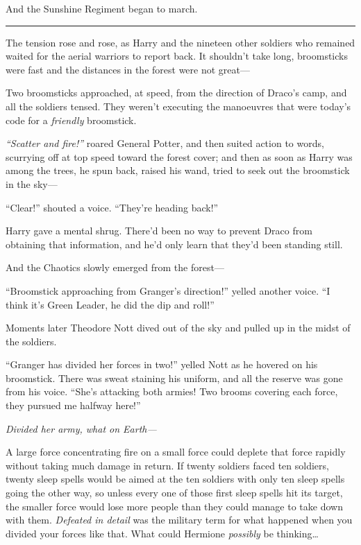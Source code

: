And the Sunshine Regiment began to march.

\begin{center}\rule{3in}{0.4pt}\end{center}

The tension rose and rose, as Harry and the nineteen other soldiers who
remained waited for the aerial warriors to report back. It shouldn't
take long, broomsticks were fast and the distances in the forest were
not great---

Two broomsticks approached, at speed, from the direction of Draco's
camp, and all the soldiers tensed. They weren't executing the manoeuvres
that were today's code for a \emph{friendly} broomstick.

\emph{``Scatter and fire!''} roared General Potter, and then suited
action to words, scurrying off at top speed toward the forest cover; and
then as soon as Harry was among the trees, he spun back, raised his
wand, tried to seek out the broomstick in the sky---

``Clear!'' shouted a voice. ``They're heading back!''

Harry gave a mental shrug. There'd been no way to prevent Draco from
obtaining that information, and he'd only learn that they'd been
standing still.

And the Chaotics slowly emerged from the forest---

``Broomstick approaching from Granger's direction!'' yelled another
voice. ``I think it's Green Leader, he did the dip and roll!''

Moments later Theodore Nott dived out of the sky and pulled up in the
midst of the soldiers.

``Granger has divided her forces in two!'' yelled Nott as he hovered on
his broomstick. There was sweat staining his uniform, and all the
reserve was gone from his voice. ``She's attacking both armies! Two
brooms covering each force, they pursued me halfway here!''

\emph{Divided her army, what on Earth---}

A large force concentrating fire on a small force could deplete that
force rapidly without taking much damage in return. If twenty soldiers
faced ten soldiers, twenty sleep spells would be aimed at the ten
soldiers with only ten sleep spells going the other way, so unless every
one of those first sleep spells hit its target, the smaller force would
lose more people than they could manage to take down with them.
\emph{Defeated in detail} was the military term for what happened when
you divided your forces like that. What could Hermione \emph{possibly}
be thinking\ldots{}

